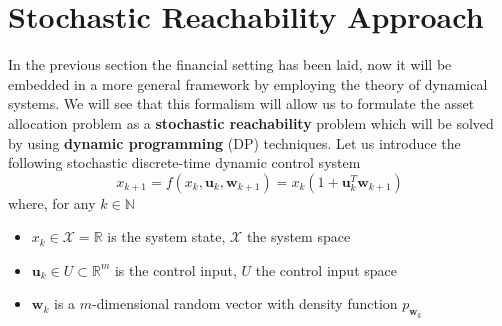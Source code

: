 \section{Stochastic Reachability Approach}
In the previous section the financial setting has been laid, now it will be embedded in a more general framework by employing the theory of dynamical systems. We will see that this formalism will allow us to formulate the asset allocation problem as a \textbf{stochastic reachability} problem which will be solved by using \textbf{dynamic programming} (DP) techniques. Let us introduce the following stochastic discrete-time dynamic control system
\begin{equation}
\label{eq:state_equation}
x_{k+1} = f(x_k,\bm{u}_k,\bm{w}_{k+1}) = x_k (1 + \bm{u}_k^T \bm{w}_{k+1}) 
\end{equation}
where, for any $k \in \mathbb{N}$
\begin{itemize}
	\item $x_k \in \mathcal{X} = \mathbb{R}$ is the system state, $\mathcal{X}$ the system space
	\item $\bm{u}_k \in U \subset \mathbb{R}^m$ is the control input, $U$ the control input space
	\item $\bm{w}_{k}$ is a $m$-dimensional random vector with density function $p_{\bm{w}_k}$
\end{itemize}

